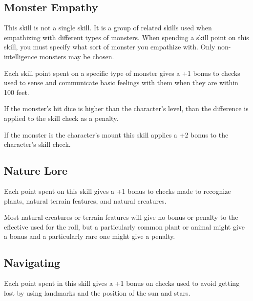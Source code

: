 \begin{multicols*}{2}

\subsection{Monster Empathy}\label{skill:Monster Empathy}
This skill is not a single skill. It is a group of related skills used when empathizing with different types of monsters. When spending a skill point on this skill, you must specify what sort of monster you empathize with. Only non-intelligence monsters may be chosen.

Each skill point spent on a specific type of monster gives a +1 bonus to  checks used to sense and communicate basic feelings with them when they are within 100 feet. 

If the monster's hit dice is higher than the character's level, than the difference is applied to the skill check as a penalty.

If the monster is the character's mount this skill applies a +2 bonus to the character's  skill check.

\subsection{Nature Lore}\label{skill:Nature Lore}
Each point spent on this skill gives a +1 bonus to  checks made to recognize plants, natural terrain features, and natural creatures.

Most natural creatures or terrain features will give no bonus or penalty to the effective  used for the roll, but a particularly common plant or animal might give a bonus and a particularly rare one might give a penalty.

\subsection{Navigating}\label{skill:Navigating}
Each point spent in this skill gives a +1 bonus on  checks used to avoid getting lost by using landmarks and the position of the sun and stars.


\end{multicols*}
